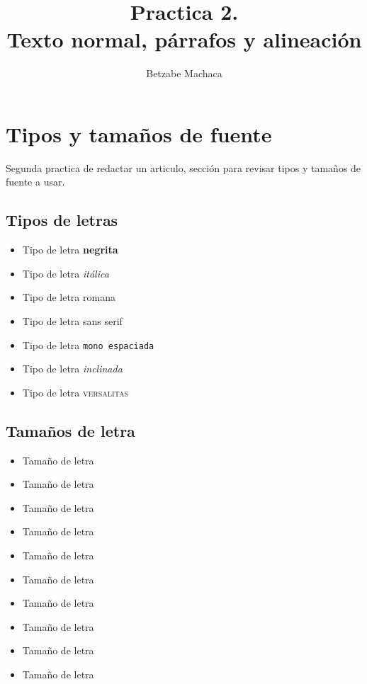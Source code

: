 \documentclass[10pt]{article}
\begin{document}
\title{Practica 2.\\ Texto normal, párrafos y alineación}
\author{Betzabe Machaca}
\date{}
\maketitle
\tableofcontents
\newpage
\section{Tipos y tamaños de fuente}
Segunda practica de redactar un articulo, sección para revisar tipos y tamaños de fuente a usar.
\subsection{Tipos de letras}
\begin{itemize}
\item Tipo de letra \textbf{negrita}
\item Tipo de letra \textit{itálica}
\item Tipo de letra \textrm{romana}
\item Tipo de letra \textsf{sans serif}
\item Tipo de letra \texttt{mono espaciada}
\item Tipo de letra \textsl{inclinada}
\item Tipo de letra \textsc{versalitas}
\end{itemize}
\subsection{Tamaños de letra}
\begin{itemize}
\item {\tiny Tamaño} de letra
\item {\scriptsize Tamaño} de letra
\item {\footnotesize Tamaño} de letra
\item {\small Tamaño} de letra
\item {\normalsize Tamaño} de letra
\item {\large Tamaño} de letra
\item {\Large Tamaño} de letra
\item {\LARGE Tamaño} de letra
\item {\huge Tamaño} de letra
\item {\Huge Tamaño} de letra
\end{itemize}
\end{document}
